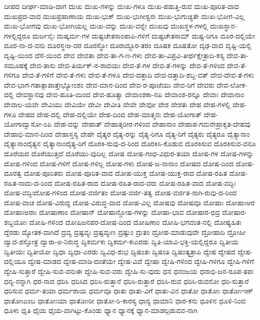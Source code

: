 {ದೀಪದ
ದೀರ್ಘ-ಮಾಡಿ-ದಾಗ
ದುಃಖ
ದುಃಖ-ಗಳನ್ನು
ದುಃಖ-ಗಳೂ
ದುಃಖ-ಪಡುತ್ತಿ-ರುವ
ದುಃಖ-ಪೂರಿತ-ವಾದ
ದುಃಖಪ್ರದ-ವಾದ
ದುಃಖಪ್ರಹಾಣಾಯ
ದುಃಖ-ಭುಕ್
ದುಃಖ-ಭುಗೀಶ್ವರಃ
ದುಃಖ-ಭುಗುಚ್ಯತೇ
ದುಃಖ-ಭೋಗ-ವಿಲ್ಲ
ದುಃಖ-ಭೋಗವು
ದುಃಖ-ಭೋಗಿಯಲ್ಲ
ದುಃಖ-ವನ್ನು
ದುಃಖ-ವನ್ನೇ
ದುಃಖವು
ದುಃಖಸ್ಥಳ-ಗಳಲ್ಲಿ
ದುಃಖಸ್ಥಾನ-ಗಳಲ್ಲಿದ್ದರೂ
ದುರ್ಜನೈಃ
ದುಷ್ಕರ್ಮ-ಗಳ
ದುಷ್ಟಚೇತಸಾಂಪಾಪಿ-ಗಳಿಗೆ
ದುಷ್ಟಚೇತಸಾಮ್
ದುಷ್ಟ-ರಿಗೂ
ದೂರ-ದಲ್ಲಿಯೇ
ದೂರ-ನಾ-ದ-ವನು
ದೂರಸ್ಥಃಅ-ವರ
ದೂರಸ್ಥೋ
ದೂರಾದ್ದೂರ-ತರಂ
ದೂಷಕ
ದೂಷತೋ
ದೃಢ-ವಾದ
ದೃಷ್ಟಿ-ಯಲ್ಲಿ
ದೃಷ್ಟಿ-ಯಿಂದ
ದೆಸೆ-ಯಿಂದ
ದೇವ
ದೇವತಾ
ದೇವ-ತಾ-ಗ-ಣ-ಗಳು
ದೇವ-ತಾ-ವಿಪ್ರವಿ-ತೀರ್ಥಕ್ಷೇತ್ರಾದಿ-ಕಸ್ಯ
ದೇವ-ತಾ-ಸಮೂಹಕ್ಕೆ
ದೇವ-ತಾಸು
ದೇವ-ತಿರ್ಯಕ್‌-ನ-ರಾದಯಃ
ದೇವ-ತೆ-ಗಳ
ದೇವ-ತೆ-ಗಳನ್ನು
ದೇವ-ತೆ-ಗಳಿಂದ
ದೇವ-ತೆ-ಗಳಿಗೂ
ದೇವ-ತೆ-ಗಳಿಗೆ
ದೇವ-ತೆ-ಗಳು
ದೇವ-ತೆ-ಗಳೂ
ದೇವ-ದತ್ತಾದಿ
ದೇವ-ದತ್ತಾದಿ-ಶಬ್ದ-ವತ್
ದೇವ-ದೇವ-ತೆ-ಗಳು
ದೇವ-ಭಾಗ-ಗತಾತ್ಪಾಪಾತ್ತೇಭ್ಯೋಂಶಂ
ದೇವ-ಮಾನ-ದಿಂದ
ದೇವ-ರ-ಪೂಜೆಯು
ದೇವ-ರಿಗೆ
ದೇವರು
ದೇವ-ಲೋಕ-ದಲ್ಲಿ
ದೇವಸ್ಥಾನವು
ದೇವ-ಹೂತಿ-ಯಿಂದ
ದೇವ-ಹೂತ್ಯಾ
ದೇವಾಂಶಕಾ-ನಪಿ
ದೇವಾಂಶ-ರನ್ನೂ
ದೇವಾಃ
ದೇವಾನಾಂ
ದೇವಾಲ-ಯವೇ
ದೇವಿಯು
ದೇವಿಯೇ
ದೇವೀ
ದೇವೀತಿ
ದೇವೇ
ದೇವೋ
ದೇಶ
ದೇಶತಃ
ದೇಹ
ದೇಹ-ಗಳಲ್ಲಿ
ದೇಹ-ಗಳೂ
ದೇಹದ
ದೇಹ-ದಲ್ಲಿ
ದೇಹ-ದಲ್ಲಿಯೇ
ದೇಹ-ದಿಂದ
ದೇಹ-ಮಾತ್ಮನಃ
ದೇಹ-ಯೋಗಾತ್
ದೇಹ-ಯೋಗಾದ್ವಾಸೋ-ಽಪಿ
ದೇಹ-ವನ್ನು
ದೇಹಾತ್
ದೇಹಾತ್ಶರೀರ-ಗಳಿಂದ
ದೇಹಾನಾಂ
ದೇಹಾಪ-ಗಮನೇಪ್ರಾಕೃತ-ದೇಹವು
ದೇಹಾಭಿ-ಮಾನ-ದಿಂದ
ದೇಹಾಸ್ತಸ್ಯ
ದೇಹೇ
ದೈತ್ಯರ
ದೈತ್ಯ-ರನ್ನು
ದೈತ್ಯ-ರಿಗೂ
ದೈತ್ಯ-ರಿಗೆ
ದೈತ್ಯರು
ದೈತ್ಯರೂ
ದೈತ್ಯಾನಾಂ
ದೈತ್ಯಾನಾಂದೈತ್ಯನ
ದೈತ್ಯಾನಾಂದೈತ್ಯ-ರಿಗೆ
ದೊರಕಿ-ರುವು-ದ-ರಿಂದ
ದೊರಕಿಸಿ-ಕೊಡುವ
ದೊರಕಿಸುವ
ದೊರಕಿಸುವ-ವನೂ
ದೊರೆಯದ
ದೊರೆಯುತ್ತದೆ
ದೊರೆಯು-ವುದಿಲ್ಲ
ದೋಷ
ದೋಷ-ಗಂಧ-ವಿಧುರ-ತಯಾ
ದೋಷ-ಗಳ
ದೋಷ-ಗಳನ್ನು
ದೋಷ-ಗಳಿಂದ
ದೋಷ-ಗಳಿಗೆ
ದೋಷ-ಗಳಿಲ್ಲ
ದೋಷ-ಗಳು
ದೋಷ-ಜ-ನಾನಾಂ
ದೋಷದ
ದೋಷ-ದಿಂದ
ದೋಷ-ದೂರತ್ವ
ದೋಷ-ಪೂರಿತರು
ದೋಷ-ಪೂರಿತ-ವಾದ
ದೋಷ-ಯುಕ್ತ
ದೋಷ-ಯುಕ್ತ-ರಾದ
ದೋಷ-ರಹಿತ
ದೋಷ-ರಹಿತ-ನಾದು-ದ-ರಿಂದ
ದೋಷ-ರಹಿತ-ರಾದ
ದೋಷ-ರಹಿತ-ರಾದ-ವರು
ದೋಷ-ರಹಿತ-ವಾದ
ದೋಷ-ವದ್ಭಿಃ
ದೋಷ-ವದ್ಭಿಃದೋಷ-ಗಳಿಂದ
ದೋಷ-ವರ್ಜಿತಂ
ದೋಷ-ವರ್ಜಿ-ತತ್ವ
ದೋಷ-ವರ್ಜಿತ-ನಾಗಿ-ರುವು-ದ-ರಿಂದ
ದೋಷ-ವಾಚ
ದೋಷ-ವಿರುದ್ದ
ದೋಷ-ವಿರುದ್ಧ-ವಾದ
ದೋಷ-ವಿಲ್ಲ
ದೋಷವು
ದೋಷವೂ
ದೋಷಾಃ
ದೋಷಾಃಅರ
ದೋಷಾಃಅರಾಃ
ದೋಷಾಣಾಂ
ದೋಷಾನ್
ದೋಷಾನ್ದೋಷ-ಗಳನ್ನು
ದೋಷಾ-ಭಾವ
ದೋಷಾರ-ಛಿದ್ರ
ದೋಷಾರ-ಶಬ್ದಯೋಃ
ದೋಷಿ-ಗಳಿಂದ
ದೋಷಿಜನಪರ-ದೋಷ-ದಿಂದ
ದೋಷಿಣಾಂ
ದೋಷಿ-ಭಗವಂತ-ನಲ್ಲಿ
ದೋಷ್ಯಹಿತಃ
ದ್ದೆರಡು
ದ್ಯೋತಕ-ವಾಗಿದೆ
ದ್ರವ್ಯ
ದ್ರಷ್ಟವ್ಯಃ
ದ್ರಷ್ಟವ್ಯಃಣ
ದ್ರಷ್ಟುಂ
ದ್ರುತಂ
ದ್ರೋಹ-ಮಾಡುವುದೇ
ದ್ರೋಹಾದಿ
ದ್ರೋಹೀ
ದ್ವಾದ-ಶಸ್ತೋತ್ರ
ದ್ವಾರಾ-ಅ-ನಿರುದ್ಧ
ದ್ವಿಕರ್ಮಕಃ
ದ್ವಿಕರ್ಮ-ಕಃಎರಡು
ದ್ವಿತಿ-ಯಾವಿ-ಭಕ್ತಿ-ಯಲ್ಲಿದ್ದರೂ
ದ್ವಿತೀಯ
ದ್ವಿತೀಯಃ
ದ್ವಿತೀಯೋ
ದ್ವಿಧಾ
ದ್ವಿಧಾ-ಎರಡು
ದ್ವಿವಿಧ-ಶುಭ
ದ್ವಿಷಂತಃ
ದ್ವಿಷಂತಿ
ದ್ವಿಷಂತ್ಯತ್ರಾಪಿ
ದ್ವೇಷ
ದ್ವೇಷದ
ದ್ವೇಷ-ದಲ್ಲಿಯೂ
ದ್ವೇಷ-ಮಾಡದ
ದ್ವೇಷ-ಮಾಡಿ-ದಂತೆಯೇ
ದ್ವೇಷ-ವಿದೆ
ದ್ವೇಷಾ
ದ್ವೇಷಿ-ಗಳಿಂದ
ದ್ವೇಷಿ-ಗಳಿಗೂ
ದ್ವೇಷಿ-ಗಳಿಗೆ
ದ್ವೇಷಿ-ಸುತ್ತಾರೆ
ದ್ವೇಷಿ-ಸುವ-ವನುಈ
ದ್ವೇಷಿ-ಸುವ-ವರು
ದ್ವೇಷಿ-ಸು-ವುದು
ಧನ
ಧನಂಜಯ
ಧನಾಭಿ-ಜನ-ರೂಪ-ತಪಃ
ಧನ್ಯ-ನನ್ನಾಗಿ
ಧರ-ನಾದ
ಧರಿಸಿ
ಧರಿಸಿದ
ಧರಿಸಿ-ರುತ್ತಾನೆ
ಧರಿಸಿ-ರುತ್ತಾರೆ
ಧರಿಸಿ-ರುವ
ಧರಿಸಿ-ರುವನೋ
ಧರಿ-ಸುತ್ತಾನೆ
ಧರಿಸುವ
ಧರ್ಮ-ತಯಾ
ಧರ್ಮರಾಯ
ಧರ್ಮವೂ
ಧಾತು
ಧಾತು-ವಿಗೆ
ಧಾತು-ವಿನ
ಧಾತೋ
ಧಾತೋಃ
ಧಾತೋಃಇಣ್
ಧಾತೋಃಎಂಬ
ಧಾತೋಃಯಾ
ಧಾತೋಃರೀ
ಧಾತೋ-ರಿ-ಕಾರಸ್ಯ
ಧಾನ್ಯ
ಧಾಮಾನಿ
ಧಾರ-ಕನು
ಧೂಳಿನ
ಧೂಳಿ-ನಿಂದ
ಧೂಳು
ಧೃತಿ
ಧೈಯ
ಧೈಯ-ವಾಗಿಟ್ಟು-ಕೊಂಡು
ಧ್ಯಾನ
ಧ್ಯಾನಕ್ಕೆ
ಧ್ಯಾನ-ಮಾಡಲ್ಪಡುವವ-ನಾಗಿ
}
